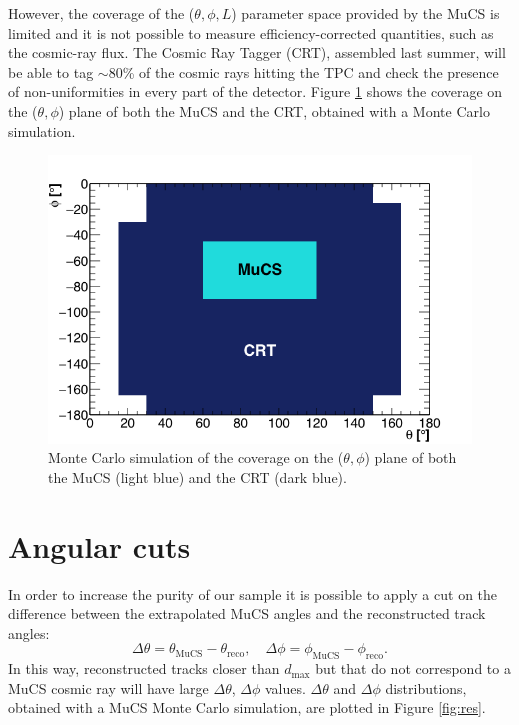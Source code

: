 \documentclass[a4paper]{scrartcl}
\begin{document}
However, the coverage of the ($\theta, \phi, L$) parameter space provided by the MuCS is limited and it is not possible to measure efficiency-corrected quantities, such as the cosmic-ray flux. The Cosmic Ray Tagger (CRT), assembled last summer, will be able to tag $\sim$80\% of the cosmic rays hitting the TPC and check the presence of non-uniformities in every part of the detector. Figure \ref{fig:crt} shows the coverage on the ($\theta,\phi$) plane of both the MuCS and the CRT, obtained with a Monte Carlo simulation.

\begin{figure}[htbp]
  \begin{center}
    \includegraphics[width=0.7\linewidth]{figures/crt.png}
    \caption{Monte Carlo simulation of the coverage on the ($\theta,\phi$) plane of both the MuCS (light blue) and the CRT (dark blue).} \label{fig:crt}
  \end{center}
\end{figure}

\clearpage{}

\appendix
\section{Angular cuts}
In order to increase the purity of our sample it is possible to apply a cut on the difference between the extrapolated MuCS angles and the reconstructed track angles:
\begin{equation}
\Delta\theta = \theta_{\mathrm{MuCS}}-\theta_{\mathrm{reco}}, \quad \Delta\phi = \phi_{\mathrm{MuCS}}-\phi_{\mathrm{reco}}.
\end{equation}
In this way, reconstructed tracks closer than $d_{\mathrm{max}}$ but that do not correspond to a MuCS cosmic ray will have large $\Delta\theta$, $\Delta\phi$ values. $\Delta\theta$ and $\Delta\phi$ distributions, obtained with a MuCS Monte Carlo simulation, are plotted in Figure \ref{fig:res}.
\end{document}
